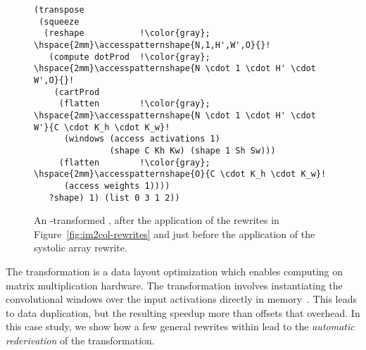 %

\begin{figure}
\begin{lstlisting}[escapechar=!]
(transpose                   
 (squeeze                    
  (reshape           !\color{gray}; \hspace{2mm}\accesspatternshape{N,1,H',W',O}{}!
   (compute dotProd  !\color{gray}; \hspace{2mm}\accesspatternshape{N \cdot 1 \cdot H' \cdot W',O}{}!          
    (cartProd                 
     (flatten        !\color{gray}; \hspace{2mm}\accesspatternshape{N \cdot 1 \cdot H' \cdot W'}{C \cdot K_h \cdot K_w}!
      (windows (access activations 1)  
               (shape C Kh Kw) (shape 1 Sh Sw)))
     (flatten        !\color{gray}; \hspace{2mm}\accesspatternshape{O}{C \cdot K_h \cdot K_w}!
      (access weights 1))))
   ?shape) 1) (list 0 3 1 2))
     \end{lstlisting}
     \vspace{-1em}
    \caption{An -transformed 
      \ctd,
    after the application of the rewrites
    in Figure~\ref{fig:im2col-rewrites}
    and just before the application
    of the systolic array rewrite.}
    \label{fig:conv2d-im2col-rewritten}
\end{figure}
  
The  transformation
  is a data layout optimization
  which enables computing \ctd
  on matrix multiplication hardware.
The transformation
  involves instantiating
  the convolutional windows
  over the input activations
  directly in memory~\cite{im2col}.
This leads to data duplication,
  but the resulting speedup
  more than offsets that overhead.
In this case study,
  we show how a few
  general rewrites
  within \g
  lead to the 
  \textit{automatic rederivation}
  of the 
   transformation.

